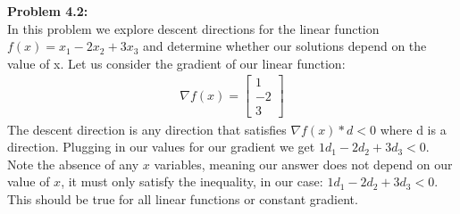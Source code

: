 \documentclass{article}
\begin{document}
 
\pagestyle{fancy}

\textbf{Problem 4.2:} \\
In this problem we explore descent directions for the linear function $f(x) = x_1 - 2x_2 + 3x_3$ and determine whether our solutions depend on the value of x. Let us consider the gradient of our linear function:
\begin{align*}
    \nabla f(x) = \begin{bmatrix} 1 \\ -2 \\ 3 \end{bmatrix}
\end{align*}
The descent direction is any direction that satisfies $\nabla f(x) * d < 0$ where d is a direction. Plugging in our values for our gradient we get $1d_1 - 2d_2 + 3d_3 < 0$. Note the absence of any $x$ variables, meaning our answer does not depend on our value of $x$, it must only satisfy the inequality, in our case: $1d_1 - 2d_2 + 3d_3 < 0$. This should be true for all linear functions or constant gradient.
\end{document}
